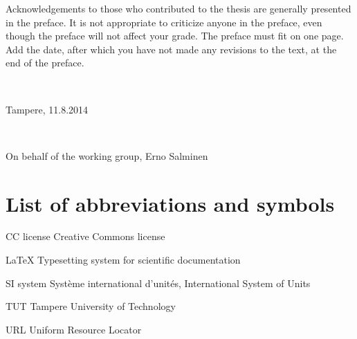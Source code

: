 \documentclass[12pt,a4paper,english
]{tutthesis}
\begin{document}
Acknowledgements to those who contributed to the thesis are generally
presented in the preface. It is not appropriate to criticize anyone in
the preface, even though the preface will not affect your grade. The
preface must fit on one page. Add the date, after which you have not
made any revisions to the text, at the end of the preface.

~ 

Tampere, 11.8.2014

~

On behalf of the working group, Erno Salminen



\setcounter{tocdepth}{3}              %
\tableofcontents                      %

\listoffigures                               %
\markboth{}{}                                %

\listoftables                                  %
\markboth{}{}                                  %



%
%
\chapter*{List of abbreviations and symbols}
\markboth{}{}                                %

\begin{termlist}
\item [CC license] Creative Commons license
\item [LaTeX] 	   Typesetting system for scientific documentation
\item [SI system]  Syst\`eme international d'unités, International System of Units
\item [TUT] 	   Tampere University of Technology
\item [URL]        Uniform Resource Locator
\end{termlist} 
\end{document}
